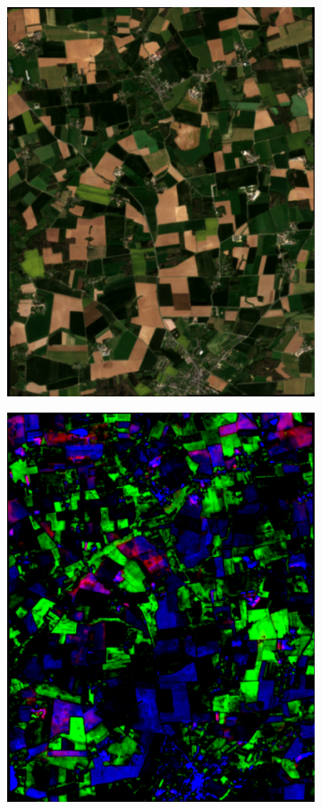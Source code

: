 \documentclass[journal,article,submit,pdftex,moreauthors]{Definitions/mdpi}
\begin{document}
\begin{figure}[H]
	\centering
	\begin{subfigure}[t]{0.23\linewidth}
		\centering
		\includegraphics[height=\linewidth,width=0.95\linewidth]{figures/reconstruction_errors/test_aoi_RGB.pdf}
	\caption{}
	\label{fig:gee_img}
	\end{subfigure}
	\begin{subfigure}[t]{0.23\linewidth}
		\centering
		\includegraphics[height=\linewidth,width=0.95\linewidth]{figures/combinations/combinations_[59, 84, 81].pdf}

\end{subfigure}
\end{figure}
\end{document}
